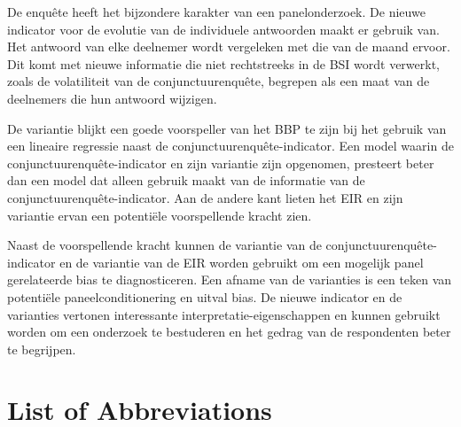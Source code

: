\documentclass[12pt,a4paper,oneside]{book}
\begin{document}
De enquête heeft het bijzondere karakter van een panelonderzoek. 
De nieuwe indicator voor de evolutie van de individuele antwoorden maakt er gebruik van. Het antwoord van elke deelnemer wordt vergeleken met die van de maand ervoor.
Dit komt met nieuwe informatie die niet rechtstreeks in de BSI wordt verwerkt, zoals de volatiliteit van de conjunctuurenquête, begrepen als een maat van de deelnemers die hun antwoord wijzigen.

De variantie blijkt een goede voorspeller van het BBP te zijn bij het gebruik van een lineaire regressie naast de conjunctuurenquête-indicator. Een model waarin de conjunctuurenquête-indicator en zijn variantie zijn opgenomen, presteert beter dan een model dat alleen gebruik maakt van de informatie van de conjunctuurenquête-indicator.
Aan de andere kant lieten het EIR en zijn variantie ervan een potentiële voorspellende kracht zien.

Naast de voorspellende kracht kunnen de variantie van de conjunctuurenquête-indicator en de variantie van de EIR worden gebruikt om een mogelijk panel gerelateerde bias te diagnosticeren. Een afname van de varianties is een teken van potentiële paneelconditionering en uitval bias.
De nieuwe indicator en de varianties vertonen interessante interpretatie-eigenschappen en kunnen gebruikt worden om een onderzoek te bestuderen en het gedrag van de respondenten beter te begrijpen.






\chapter*{List of Abbreviations}
\end{document}
